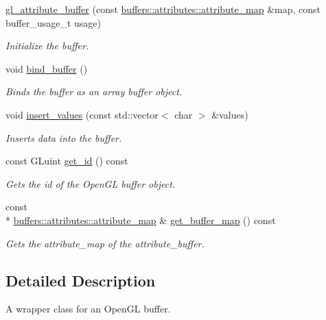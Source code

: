 \begin{DoxyCompactItemize}
\item 
\hyperlink{classoccluded_1_1opengl_1_1retained_1_1gl__attribute__buffer_afde90951c4cebabd6a6d80e5a7027cf0}{gl\+\_\+attribute\+\_\+buffer} (const \hyperlink{classoccluded_1_1buffers_1_1attributes_1_1attribute__map}{buffers\+::attributes\+::attribute\+\_\+map} \&map, const buffer\+\_\+usage\+\_\+t usage)
\begin{DoxyCompactList}\small\item\em Initialize the buffer. \end{DoxyCompactList}\item 
void \hyperlink{classoccluded_1_1opengl_1_1retained_1_1gl__attribute__buffer_a58ea21106acfac03c3cc5b35ce59f6b2}{bind\+\_\+buffer} ()
\begin{DoxyCompactList}\small\item\em Binds the buffer as an array buffer object. \end{DoxyCompactList}\item 
void \hyperlink{classoccluded_1_1opengl_1_1retained_1_1gl__attribute__buffer_afd58deefb5659c0cd9a316263515b68f}{insert\+\_\+values} (const std\+::vector$<$ char $>$ \&values)
\begin{DoxyCompactList}\small\item\em Inserts data into the buffer. \end{DoxyCompactList}\item 
const G\+Luint \hyperlink{classoccluded_1_1opengl_1_1retained_1_1gl__attribute__buffer_ab23624ebadcabdcb0d028e2fe0039ffd}{get\+\_\+id} () const 
\begin{DoxyCompactList}\small\item\em Gets the id of the Open\+G\+L buffer object. \end{DoxyCompactList}\item 
const \\*
\hyperlink{classoccluded_1_1buffers_1_1attributes_1_1attribute__map}{buffers\+::attributes\+::attribute\+\_\+map} \& \hyperlink{classoccluded_1_1opengl_1_1retained_1_1gl__attribute__buffer_a1241841aa913b0df057b5d885f1447b4}{get\+\_\+buffer\+\_\+map} () const 
\begin{DoxyCompactList}\small\item\em Gets the attribute\+\_\+map of the attribute\+\_\+buffer. \end{DoxyCompactList}\end{DoxyCompactItemize}


\subsection{Detailed Description}
A wrapper class for an Open\+G\+L buffer. 

